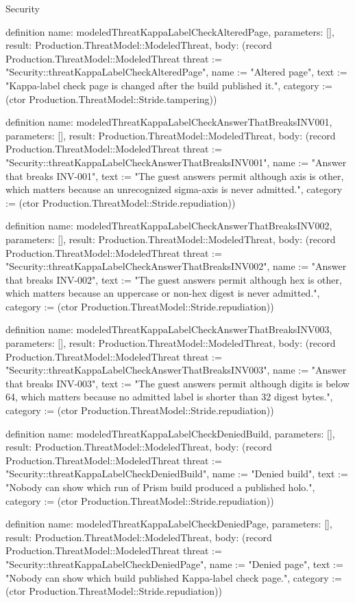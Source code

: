 \begin{lexlean}{Security}
\begin{semanticmodule}
definition{
  name: modeledThreatKappaLabelCheckAlteredPage,
  parameters: [],
  result: Production.ThreatModel::ModeledThreat,
  body: (record Production.ThreatModel::ModeledThreat {threat := "Security::threatKappaLabelCheckAlteredPage", name := "Altered page", text := "Kappa-label check page is changed after the build published it.", category := (ctor Production.ThreatModel::Stride.tampering)})
}

definition{
  name: modeledThreatKappaLabelCheckAnswerThatBreaksINV001,
  parameters: [],
  result: Production.ThreatModel::ModeledThreat,
  body: (record Production.ThreatModel::ModeledThreat {threat := "Security::threatKappaLabelCheckAnswerThatBreaksINV001", name := "Answer that breaks INV-001", text := "The guest answers permit although axis is other, which matters because an unrecognized sigma-axis is never admitted.", category := (ctor Production.ThreatModel::Stride.repudiation)})
}

definition{
  name: modeledThreatKappaLabelCheckAnswerThatBreaksINV002,
  parameters: [],
  result: Production.ThreatModel::ModeledThreat,
  body: (record Production.ThreatModel::ModeledThreat {threat := "Security::threatKappaLabelCheckAnswerThatBreaksINV002", name := "Answer that breaks INV-002", text := "The guest answers permit although hex is other, which matters because an uppercase or non-hex digest is never admitted.", category := (ctor Production.ThreatModel::Stride.repudiation)})
}

definition{
  name: modeledThreatKappaLabelCheckAnswerThatBreaksINV003,
  parameters: [],
  result: Production.ThreatModel::ModeledThreat,
  body: (record Production.ThreatModel::ModeledThreat {threat := "Security::threatKappaLabelCheckAnswerThatBreaksINV003", name := "Answer that breaks INV-003", text := "The guest answers permit although digits is below 64, which matters because no admitted label is shorter than 32 digest bytes.", category := (ctor Production.ThreatModel::Stride.repudiation)})
}

definition{
  name: modeledThreatKappaLabelCheckDeniedBuild,
  parameters: [],
  result: Production.ThreatModel::ModeledThreat,
  body: (record Production.ThreatModel::ModeledThreat {threat := "Security::threatKappaLabelCheckDeniedBuild", name := "Denied build", text := "Nobody can show which run of Prism build produced a published holo.", category := (ctor Production.ThreatModel::Stride.repudiation)})
}

definition{
  name: modeledThreatKappaLabelCheckDeniedPage,
  parameters: [],
  result: Production.ThreatModel::ModeledThreat,
  body: (record Production.ThreatModel::ModeledThreat {threat := "Security::threatKappaLabelCheckDeniedPage", name := "Denied page", text := "Nobody can show which build published Kappa-label check page.", category := (ctor Production.ThreatModel::Stride.repudiation)})
}


\end{semanticmodule}
\end{lexlean}
